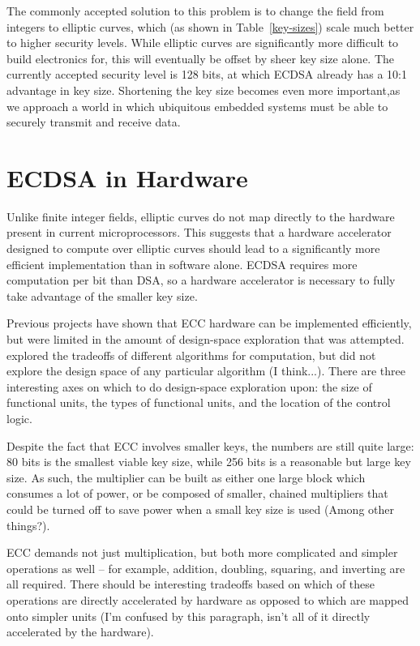 \documentclass[twocolumn]{article}
\begin{document}
The commonly accepted solution to this problem is to change the field
from integers to elliptic curves, which (as shown in
Table~\ref{key-sizes}) scale much better to higher security levels.
While elliptic curves are significantly more difficult to build
electronics for, this will eventually be offset by sheer key size
alone.  The currently accepted security level is 128 bits, at which
ECDSA already has a 10:1 advantage in key size. Shortening the key 
size becomes even more important,as we approach a world in which 
ubiquitous embedded systems must be able to securely transmit and 
receive data.  

\section{ECDSA in Hardware}

Unlike finite integer fields, elliptic curves do not map directly to
the hardware present in current microprocessors\cite{kss-ecdsa}. This
suggests that a hardware accelerator designed to compute over elliptic
curves should lead to a significantly more efficient implementation
than in software alone. ECDSA requires more computation per bit than DSA, 
so a hardware accelerator is necessary to fully take advantage of the 
smaller key size. 

Previous projects\cite{nnll-ecdsa_hw} have shown that ECC hardware can
be implemented efficiently, but were limited in the amount of
design-space exploration that was attempted. \cite{mmm-hw_ecc} explored 
the tradeoffs of different algorithms for computation, but did not explore 
the design space of any particular algorithm (I think...).  There
are three interesting axes on which to do design-space exploration
upon: the size of functional units, the types of functional units, and
the location of the control logic.

Despite the fact that ECC involves smaller keys, the numbers are still
quite large: 80 bits is the smallest viable key size, while 256 bits
is a reasonable but large key size.  As such, the multiplier can be built 
as either one large block  which consumes a lot of power, or be composed of 
smaller, chained multipliers that could be turned off to save power when a
small key size is used (Among other things?).   

ECC demands not just multiplication, but both more complicated and
simpler operations as well -- for example, addition, doubling,
squaring, and inverting are all required.  There should be interesting
tradeoffs based on which of these operations are directly accelerated
by hardware as opposed to which are mapped onto simpler units (I'm confused
by this paragraph, isn't all of it directly accelerated by the hardware). 
\end{document}

